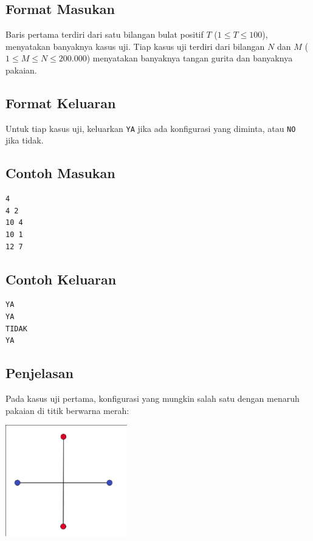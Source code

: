 \documentclass{article}
\begin{document}
\subsection*{Format Masukan}
Baris pertama terdiri dari satu bilangan bulat positif $T$ ($1 \leq T \leq 100$), menyatakan banyaknya kasus uji.
Tiap kasus uji terdiri dari bilangan $N$ dan $M$ ($1 \leq M \leq N \leq 200.000$) menyatakan banyaknya tangan gurita dan banyaknya pakaian.

\subsection*{Format Keluaran}
Untuk tiap kasus uji, keluarkan \lstinline{YA} jika ada konfigurasi yang diminta, atau \lstinline{NO} jika tidak.

\begin{multicols}{2}
\subsection*{Contoh Masukan}
\begin{lstlisting}
4
4 2
10 4
10 1
12 7
\end{lstlisting}
\columnbreak
\subsection*{Contoh Keluaran}
\begin{lstlisting}
YA
YA
TIDAK
YA
\end{lstlisting}
\vfill
\null
\end{multicols}

\pagebreak

\subsection*{Penjelasan}
Pada kasus uji pertama, konfigurasi yang mungkin salah satu dengan menaruh pakaian di titik berwarna merah:

\includegraphics[width=200px]{sample-1}
\end{document}
